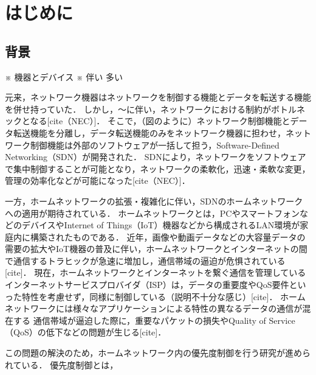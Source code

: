 \documentclass[a4paper,11pt,uplatex]{ujreport}
\begin{document}
\tableofcontents

\clearpage


\chapter{はじめに}
\label{chap:Introduction}


\section{背景}
\label{sec:背景}


  ※ 機器とデバイス
  ※ 伴い 多い

  元来，ネットワーク機器はネットワークを制御する機能とデータを転送する機能を併せ持っていた．
  しかし，〜に伴い，ネットワークにおける制約がボトルネックとなる[cite（NEC）]．
  そこで，（図のように）ネットワーク制御機能とデータ転送機能を分離し，データ転送機能のみをネットワーク機器に担わせ，ネットワーク制御機能は外部のソフトウェアが一括して担う，Software-Defined Networking（SDN）が開発された．
  SDNにより，ネットワークをソフトウェアで集中制御することが可能となり，ネットワークの柔軟化，迅速・柔軟な変更，管理の効率化などが可能になった[cite（NEC）]．\par
  一方，ホームネットワークの拡張・複雑化に伴い，SDNのホームネットワークへの適用が期待されている．
  ホームネットワークとは，PCやスマートフォンなどのデバイスやInternet of Things（IoT）機器などから構成されるLAN環境が家庭内に構築されたものである．
  近年，画像や動画データなどの大容量データの需要の拡大やIoT機器の普及に伴い，ホームネットワークとインターネットの間で通信するトラヒックが急速に増加し，通信帯域の逼迫が危惧されている[cite]．
  現在，ホームネットワークとインターネットを繋ぐ通信を管理しているインターネットサービスプロバイダ（ISP）は，データの重要度やQoS要件といった特性を考慮せず，同様に制御している（説明不十分な感じ）[cite]．
  ホームネットワークには様々なアプリケーションによる特性の異なるデータの通信が混在する
  通信帯域が逼迫した際に，重要なパケットの損失やQuality of Service（QoS）の低下などの問題が生じる[cite]．\par
  この問題の解決のため，ホームネットワーク内の優先度制御を行う研究が進められている．
  優先度制御とは，
\end{document}
